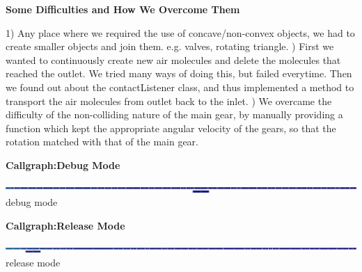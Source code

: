 \documentclass[40pt]{article}
\begin{document}
\begin{center}

\huge{
\textbf{Some Difficulties and How We Overcome Them\\}}
\end{center}
\Large
{
1) Any place where we required the use of concave/non-convex objects, we had to create smaller objects and join them. e.g. valves, rotating triangle.\newline
{}) First we wanted to continuously create new air molecules and delete the molecules that reached the outlet. We tried many ways of doing this, but failed everytime. Then we found out about the contactListener class, and thus implemented a method to transport the air molecules from outlet back to the inlet.
\newline
{}) We overcame the difficulty of the non-colliding nature of the main gear, by manually providing a function which kept the appropriate angular velocity of the gears, so that the rotation matched with that of the main gear.
\newline
\newline
}


\newpage

\begin{center}

\huge{
\textbf{Callgraph:Debug Mode\\}}
\end{center}
\begin{center}
\includegraphics[scale=0.04]{normalanalysis.png}\newline
\small{debug mode\\}
\end{center}

\begin{center}

\huge{
\textbf{Callgraph:Release Mode\\}}
\end{center}
\begin{center}
\includegraphics[scale=0.035]{releaseanalysis.png}\newline
\small{release mode\\}
\end{center}
\end{document}
